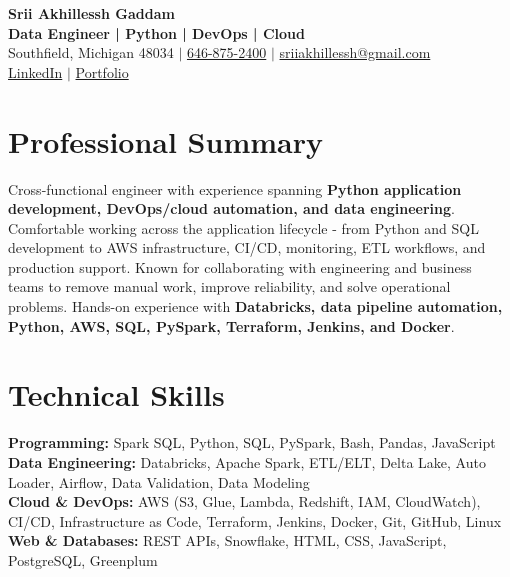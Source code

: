 \documentclass[letterpaper,10pt]{article}
\begin{document}
\fontsize{9.35pt}{10.45pt}\selectfont

\begin{center}
    {\LARGE \textbf{Srii Akhillessh Gaddam}} \\[-1pt]
    \textbf{Data Engineer | Python | DevOps | Cloud} \\[2pt]
    Southfield, Michigan 48034 $|$
    \href{tel:6468752400}{646-875-2400} $|$
    \href{mailto:sriiakhillessh@gmail.com}{sriiakhillessh@gmail.com} \\[1pt]
    \href{https://www.linkedin.com/in/srii-akhiilessh-gaddam-b48668191/}{LinkedIn} $|$
    \href{https://sriiakhillesshg.github.io/portfolio/}{Portfolio}
\end{center}
\vspace{-8pt}

\section{Professional Summary}
\small{Cross-functional engineer with experience spanning \textbf{Python application development, DevOps/cloud automation, and data engineering}. Comfortable working across the application lifecycle - from Python and SQL development to AWS infrastructure, CI/CD, monitoring, ETL workflows, and production support. Known for collaborating with engineering and business teams to remove manual work, improve reliability, and solve operational problems. Hands-on experience with \textbf{Databricks, data pipeline automation, Python, AWS, SQL, PySpark, Terraform, Jenkins, and Docker}.}

\section{Technical Skills}
\small{
\textbf{Programming:} Spark SQL, Python, SQL, PySpark, Bash, Pandas, JavaScript \\
\textbf{Data Engineering:} Databricks, Apache Spark, ETL/ELT, Delta Lake, Auto Loader, Airflow, Data Validation, Data Modeling \\
\textbf{Cloud \& DevOps:} AWS (S3, Glue, Lambda, Redshift, IAM, CloudWatch), CI/CD, Infrastructure as Code, Terraform, Jenkins, Docker, Git, GitHub, Linux \\
\textbf{Web \& Databases:} REST APIs, Snowflake, HTML, CSS, JavaScript, PostgreSQL, Greenplum
}
\end{document}
